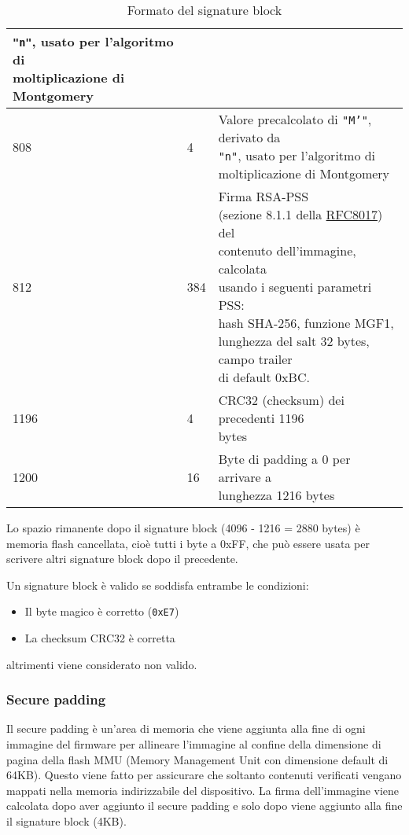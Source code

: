 \documentclass[a4paper]{article}
\begin{document}
\begin{table}[H]
\begin{tabular}{|l|l|l|}
{        \texttt{"n"}, usato per l'algoritmo di \\
        moltiplicazione di Montgomery
      } \\
    \hline
      808 & 4 & \makecell[l]{
        Valore precalcolato di \texttt{"M'"}, derivato da \\
        \texttt{"n"}, usato per l'algoritmo di \\
        moltiplicazione di Montgomery
      } \\
    \hline
      812 & 384 & \makecell[l]{
        Firma RSA-PSS \\
        (sezione 8.1.1 della \href{https://www.rfc-editor.org/rfc/rfc8017.html}{RFC8017})
        del \\ contenuto dell'immagine, calcolata \\ usando i seguenti
        parametri PSS: \\ hash SHA-256, funzione MGF1, \\ lunghezza
        del salt 32 bytes, campo trailer \\ di default 0xBC.
      } \\
    \hline
      1196 & 4 & \makecell[l]{
        CRC32 (checksum) dei precedenti 1196 \\ bytes
      } \\
    \hline
      1200 & 16 & \makecell[l]{
        Byte di padding a 0 per arrivare a \\ lunghezza 1216 bytes
      } \\
    \hline
  \end{tabular}
  \caption{Formato del signature block}
\end{table}
\noindent
Lo spazio rimanente dopo il signature block (4096 - 1216 = 2880 bytes) è memoria
flash cancellata, cioè tutti i byte a 0xFF, che può essere usata per scrivere altri
signature block dopo il precedente.

\vspace{1em}
\label{Verifica del signature block}
\noindent
Un signature block è valido se soddisfa entrambe le condizioni:
\begin{itemize}
  \item Il byte magico è corretto (\texttt{0xE7})
  \item La checksum CRC32 è corretta
\end{itemize}
altrimenti viene considerato non valido.

\subsubsection{Secure padding} \label{Secure padding}
Il secure padding è un'area di memoria che viene aggiunta alla fine di ogni
immagine del firmware per allineare l'immagine al confine della dimensione di pagina
della flash MMU (Memory Management Unit con dimensione default di 64KB).
Questo viene fatto per assicurare che soltanto
contenuti verificati vengano mappati nella memoria indirizzabile del dispositivo.
La firma dell'immagine viene calcolata dopo aver aggiunto il secure padding e solo
dopo viene aggiunto alla fine il signature block (4KB).
\end{document}
